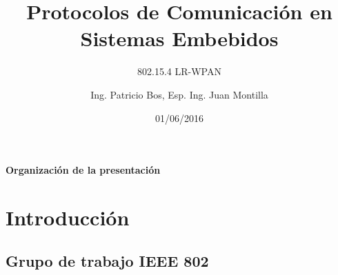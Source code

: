 \documentclass[aspectratio=169]{beamer}
\title[802.15.4 LR-WPAN]{Protocolos de Comunicación en Sistemas Embebidos}
\subtitle{802.15.4 LR-WPAN}
\author[]{Ing. Patricio Bos, Esp. Ing. Juan Montilla}
\institute[CESE-FIUBA]{Carrera de Especialización en Sistemas Embebidos - FIUBA}
\date{01/06/2016}
\begin{document}
\begingroup
\makeatletter
\setlength{\hoffset}{-.5\beamer@sidebarwidth}
\makeatother
\begin{frame}
  \titlepage
\end{frame}

\endgroup



\begin{frame}{\textbf{Organización de la presentación}}
  \tableofcontents
\end{frame}
%
%

\section{Introducción}

\subsection[IEEE 802]{Grupo de trabajo IEEE 802}
\end{document}
